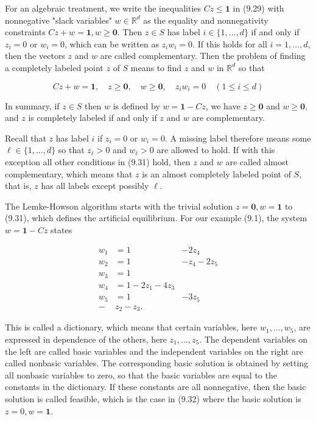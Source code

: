\documentclass[12pt]{article}
\begin{document}
For an algebraic treatment, we write the inequalities $C z \leq \mathbf{1}$ in (9.29) with nonnegative "slack variables" $w \in \mathbb{R}^{d}$ as the equality and nonnegativity constraints $C z+w=\mathbf{1}, w \geq \mathbf{0}$. Then $z \in S$ has label $i \in\{1, \ldots, d\}$ if and only if $z_{i}=0$ or $w_{i}=0$, which can be written as $z_{i} w_{i}=0$. If this holds for all $i=1, \ldots, d$, then the vectors $z$ and $w$ are called complementary. Then the problem of finding a completely labeled point $z$ of $S$ means to find $z$ and $w$ in $\mathbb{R}^{d}$ so that


\begin{equation*}
C z+w=\mathbf{1}, \quad z \geq \mathbf{0}, \quad w \geq \mathbf{0}, \quad z_{i} w_{i}=0 \quad(1 \leq i \leq d) \tag{9.31}
\end{equation*}


In summary, if $z \in S$ then $w$ is defined by $w=\mathbf{1}-C z$, we have $z \geq \mathbf{0}$ and $w \geq \mathbf{0}$, and $z$ is completely labeled if and only if $z$ and $w$ are complementary.

Recall that $z$ has label $i$ if $z_{i}=0$ or $w_{i}=0$. A missing label therefore means some $\ell \in\{1, \ldots, d\}$ so that $z_{\ell}>0$ and $w_{\ell}>0$ are allowed to hold. If with this exception all other conditions in (9.31) hold, then $z$ and $w$ are called almost complementary, which means that $z$ is an almost completely labeled point of $S$, that is, $z$ has all labels except possibly $\ell$.

The Lemke-Howson algorithm starts with the trivial solution $z=\mathbf{0}, w=\mathbf{1}$ to (9.31), which defines the artificial equilibrium. For our example (9.1), the system $w=\mathbf{1}-C z$ states

\[
\begin{array}{lrl}
w_{1} & =1 & -2 z_{4} \\
w_{2} & =1 & -z_{4}-2 z_{5} \\
w_{3} & =1 &  \tag{9.32}\\
w_{4} & =1-2 z_{1}-4 z_{3} & \\
w_{5} & =1 & -3 z_{5} \\
- & z_{2}-z_{3} . &
\end{array}
\]

This is called a dictionary, which means that certain variables, here $w_{1}, \ldots, w_{5}$, are expressed in dependence of the others, here $z_{1}, \ldots, z_{5}$. The dependent variables on the left are called basic variables and the independent variables on the right are\\
called nonbasic variables. The corresponding basic solution is obtained by setting all nonbasic variables to zero, so that the basic variables are equal to the constants in the dictionary. If these constants are all nonnegative, then the basic solution is called feasible, which is the case in (9.32) where the basic solution is $z=0, w=\mathbf{1}$.
\end{document}
